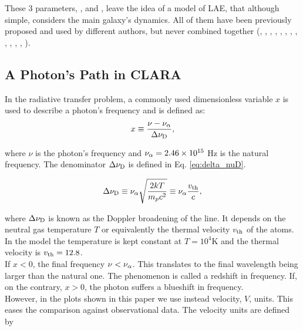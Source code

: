 \documentclass[twocolappendix]{latex/emulateapj}
\begin{document}
These 3 parameters, \vrot, \vout and \tauh, leave the idea of a model of LAE, that although simple, considers the main galaxy's dynamics. All of them have been previously proposed and used by different authors, but never combined together (\cite{Adams72}, \cite{Harrington73}, \cite{Neufeld90}, \cite{Dijkstra06}, \cite{Verhamme06}, \cite{Forero12}, \cite{Martin2015}, \cite{Garavito14}, \cite{Neufeld91}, \cite{Laursen09}, \cite{Barnes11}, \cite{Verhamme12}, \cite{Yajima12}).\\

\subsection{A \lya Photon's Path in CLARA}
\label{subsec:photons_path_clara}

In the \lya radiative transfer problem, a commonly used dimensionless variable $x$ is used to describe a photon's frequency and is defined as:\\

\begin{equation}
	\label{eq:x_freq}
	x \equiv \frac{\nu -\nu_{\rm \alpha}}{\Delta\nu_{\rm D}},
\end{equation} 

where $\nu$ is the photon's frequency and $\nu_{\rm \alpha} = 2.46\times 10^{15}$ Hz is the \lya natural frequency. The denominator $\Delta\nu_{\rm D}$ is defined in Eq. \ref{eq:delta_nuD}.

\begin{equation}
	\label{eq:delta_nuD}
	\Delta\nu_{\rm D} \equiv \nu_{\rm \alpha}\sqrt{\frac{2kT}{m_pc^2}} \equiv \nu_{\rm \alpha} \frac{v_{\rm th}}{c},
\end{equation} 

where $\Delta\nu_{\rm D}$ is known as the Doppler broadening of the \lya line. It depends on the neutral gas temperature $T$ or equivalently the thermal velocity $v_{\rm th}$ of the atoms. In the model the temperature is kept constant at $T=10^4$K and the thermal velocity is $v_{\rm th}=12.8$\kms. \\

If $x < 0$, the final frequency $\nu < \nu_{\rm \alpha}$. This translates to the final wavelength being larger than the \lya natural one. The phenomenon is called a redshift in frequency. If, on the contrary, $x > 0$, the photon suffers a blueshift in frequency. \\

However, in the plots shown in this paper we use instead velocity, $V$, units. This eases the comparison against observational data. The velocity units are defined by
\end{document}
